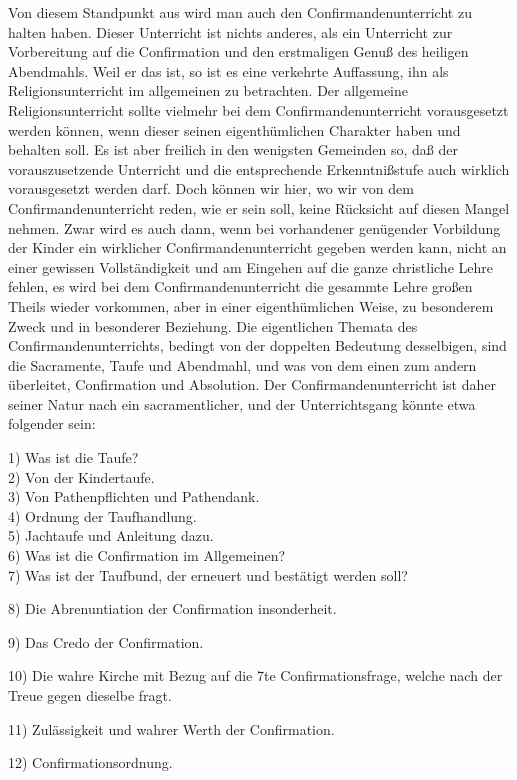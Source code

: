 Von diesem Standpunkt aus wird man auch den Confirmandenunterricht zu halten haben. Dieser Unterricht ist nichts anderes, als ein Unterricht zur Vorbereitung auf die Confirmation und den erstmaligen Genuß des heiligen Abendmahls. Weil er das ist, so ist es eine verkehrte Auffassung, ihn als Religionsunterricht im allgemeinen zu betrachten. Der allgemeine Religionsunterricht sollte vielmehr bei dem Confirmandenunterricht vorausgesetzt werden können, wenn dieser seinen eigenthümlichen Charakter haben und behalten soll. Es ist aber freilich in den wenigsten Gemeinden so, daß der
vorauszusetzende Unterricht und die entsprechende Erkenntnißstufe auch wirklich vorausgesetzt werden darf. Doch können wir hier, wo wir von dem Confirmandenunterricht reden, wie er sein soll, keine Rücksicht auf diesen Mangel nehmen. Zwar wird es auch dann, wenn bei vorhandener genügender Vorbildung der Kinder ein wirklicher Confirmandenunterricht gegeben werden kann, nicht an einer gewissen Vollständigkeit und am Eingehen auf die ganze christliche Lehre fehlen, es wird bei dem Confirmandenunterricht die gesammte Lehre großen Theils wieder vorkommen, aber in einer eigenthümlichen Weise, zu besonderem Zweck und in besonderer Beziehung. Die eigentlichen Themata des Confirmandenunterrichts, bedingt von der doppelten Bedeutung desselbigen, sind die Sacramente, Taufe und Abendmahl, und was von dem einen zum andern überleitet, Confirmation und Absolution. Der Confirmandenunterricht ist daher seiner Natur nach ein sacramentlicher, und der Unterrichtsgang könnte etwa folgender sein:

1) Was ist die Taufe?\\
2) Von der Kindertaufe.\\
3) Von Pathenpflichten und Pathendank.\\
4) Ordnung der Taufhandlung.\\
5) Jachtaufe und Anleitung dazu.\\
6) Was ist die Confirmation im Allgemeinen?\\
7) Was ist der Taufbund, der erneuert und bestätigt werden soll?

8) Die Abrenuntiation der Confirmation insonderheit.

9) Das Credo der Confirmation.

10) Die wahre Kirche mit Bezug auf die 7te Confirmationsfrage, welche nach der Treue gegen dieselbe fragt.

11) Zulässigkeit und wahrer Werth der Confirmation.

12) Confirmationsordnung.

